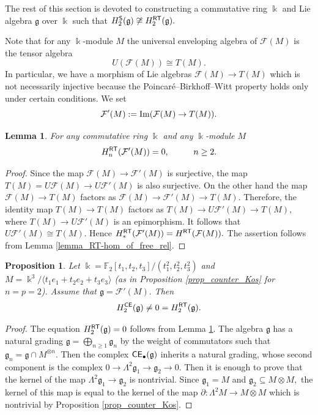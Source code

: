 \documentclass{amsart}
\numberwithin{equation}{section}
\newtheorem{lemma}[theorem]{Lemma}
\newtheorem{proposition}[theorem]{Proposition}
\theoremstyle{definition}
\def\FF{\mathcal{F}}
\def\gg{\mathfrak{g}}
\def\kk{\Bbbk}
\begin{document}
The rest of this section is devoted to constructing a commutative ring $\kk$ and Lie algebra $\gg$ over $\kk$ such that $H_2^{\sf S}(\gg)\not\cong H_2^{\sf RT}(\gg).$ 

Note that for any $\kk$-module $M$ the universal enveloping algebra of $\FF(M)$ is the tensor algebra
$$U(\FF(M))\cong T(M).$$ In particular, we have a morphism of Lie algebras 
$\FF(M)\to T(M)$ which is not necessarily injective because the Poincar\'e–Birkhoff–Witt property holds only under certain conditions. We set 
$$\FF'(M):={\rm Im}(\FF(M)\to T(M)).$$
\begin{lemma}\label{lemma_F'}
For any commutative ring $\kk$ and any $\kk$-module $M$ 
$$H_n^{\sf RT}(\FF'(M))=0, \hspace{1cm} n\geq 2.$$
\end{lemma}
\begin{proof}
Since the map $\FF(M)\to \FF'(M)$ is surjective, the map $T(M)=U\FF(M)\to U\FF'(M)$ is also surjective. On the other hand the map $\FF(M)\to T(M)$ factors as $\FF(M)\to \FF'(M)\to T(M).$ Therefore, the identity map $T(M)\to T(M)$ factors as $T(M)\to U\FF'(M)\to T(M),$ where $T(M)\to U\FF'(M)$ is an epimorphism. It follows that $U\FF'(M)\cong T(M).$ Hence $H^{\sf RT}_*(\FF'(M))=H^{\sf RT}(\FF(M)).$ The assertion follows from Lemma \ref{lemma_RT-hom_of_free_rel}.
\end{proof}

\begin{proposition}\label{prop_counter_H_2}
Let $\kk=\mathbb F_2[t_1,t_2,t_3]/(t_1^2,t_2^2,t_3^2)$ and $M=\kk^3/\langle t_1e_1+t_2e_2+t_3e_3\rangle$ (as in Proposition \ref{prop_counter_Kos} for $n=p=2$). Assume that $\gg=\FF'(M).$ Then 
$$H^{\sf CE}_2(\gg)\ne 0=H^{\sf RT}_2(\gg).$$
\end{proposition}
\begin{proof} The equation $H^{\sf RT}_2(\gg)=0$ follows from Lemma \ref{lemma_F'}. The algebra $\gg$ has a natural grading $\gg=\bigoplus_{n\geq 1} \gg_n$ by the weight of commutators such that $\gg_n=\gg\cap M^{\otimes n}.$ Then the complex ${\sf CE}_\bullet(\gg)$ inherits a natural grading, whose second component is the complex $0\to \Lambda^2\gg_1 \to \gg_2\to 0.$ Then it is enough to prove that the kernel of the map $\Lambda^2\gg_1 \to \gg_2$ is nontrivial. 
Since $\gg_1=M$ and $\gg_2\subseteq M\otimes M,$ the kernel of this map is equal to the kernel of the map $\partial:\Lambda^2 M \to M\otimes M$ which is nontrivial by Proposition \ref{prop_counter_Kos}. 
\end{proof}
\end{document}
